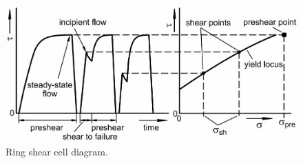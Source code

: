 \begin{figure}[!htb]
\centering
\includegraphics[width=.80\columnwidth]{images/002srsctdiagram}
\caption[Ring shear cell diagram]{Ring shear cell diagram.}
\label{fig:002srsctdiagram}
\end{figure}